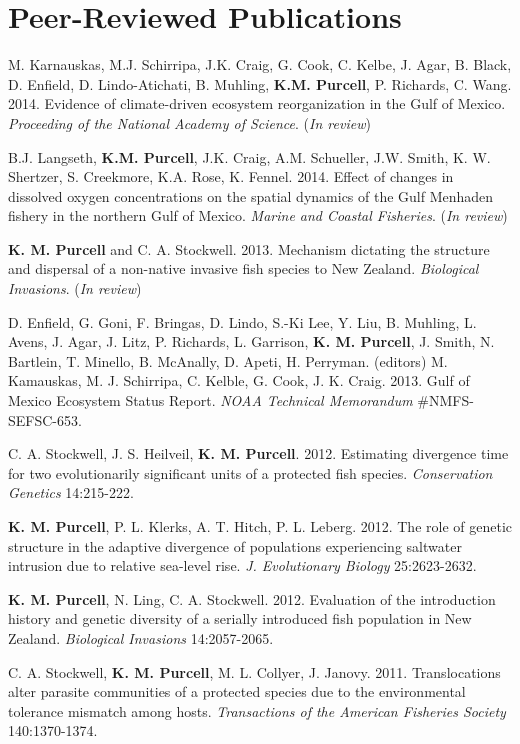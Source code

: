 \documentclass[letterpaper]{article}
\renewenvironment{itemize}{
  \begin{list}{}{
    \setlength{\leftmargin}{1em}
  }
}{
  \end{list}
}
\begin{document}
\section*{Peer-Reviewed Publications}
	\begin{itemize}
    \item M. Karnauskas, M.J. Schirripa, J.K. Craig, G. Cook, C. Kelbe, J. Agar, B. Black, D. Enfield, D. Lindo-Atichati, B. Muhling, \textbf{K.M. Purcell}, P. Richards, C. Wang.  2014. Evidence of climate-driven ecosystem reorganization in the Gulf of Mexico.  \textit{Proceeding of the National Academy of Science}. (\textit{In review})
		\item B.J. Langseth, \textbf{K.M. Purcell}, J.K. Craig, A.M. Schueller, J.W. Smith, K. W. Shertzer, S. Creekmore, K.A. Rose, K. Fennel. 2014. Effect of changes in dissolved oxygen concentrations on the spatial dynamics of the Gulf Menhaden fishery in the northern Gulf of Mexico. \textit{Marine and Coastal Fisheries}. (\textit{In review})
		\item \textbf{K. M. Purcell} and C. A. Stockwell. 2013. Mechanism dictating the structure and dispersal of a non-native invasive fish species to New Zealand. \textit{Biological Invasions}. (\textit{In review})
		\item D. Enfield, G. Goni, F. Bringas, D. Lindo, S.-Ki Lee, Y. Liu, B. Muhling, L. Avens, J. Agar, J. Litz, P. Richards, L. Garrison, \textbf{K. M. Purcell}, J. Smith, N. Bartlein, T. Minello, B. McAnally, D. Apeti, H. Perryman. (editors) M. Kamauskas, M. J. Schirripa, C. Kelble, G. Cook, J. K. Craig. 2013. Gulf of Mexico Ecosystem Status Report. \textit{NOAA Technical Memorandum} #NMFS-SEFSC-653.
		\item C. A. Stockwell, J. S. Heilveil, \textbf{K. M. Purcell}. 2012. Estimating divergence time for two evolutionarily significant units of a protected fish species. \textit{Conservation Genetics} 14:215-222.
		\item \textbf{K. M. Purcell}, P. L. Klerks, A. T. Hitch, P. L. Leberg. 2012. The role of genetic structure in the adaptive divergence of populations experiencing saltwater intrusion due to relative sea-level rise. \textit{J. Evolutionary Biology} 25:2623-2632.
		\item \textbf{K. M. Purcell}, N. Ling, C. A. Stockwell. 2012. Evaluation of the introduction history and genetic diversity of a serially introduced fish population in New Zealand. \textit{Biological Invasions} 14:2057-2065.
		\item C. A. Stockwell, \textbf{K. M. Purcell}, M. L. Collyer, J. Janovy. 2011. Translocations alter parasite communities of a protected species due to the environmental tolerance mismatch among hosts. \textit{Transactions of the American Fisheries Society} 140:1370-1374.

\end{itemize}
\end{document}
